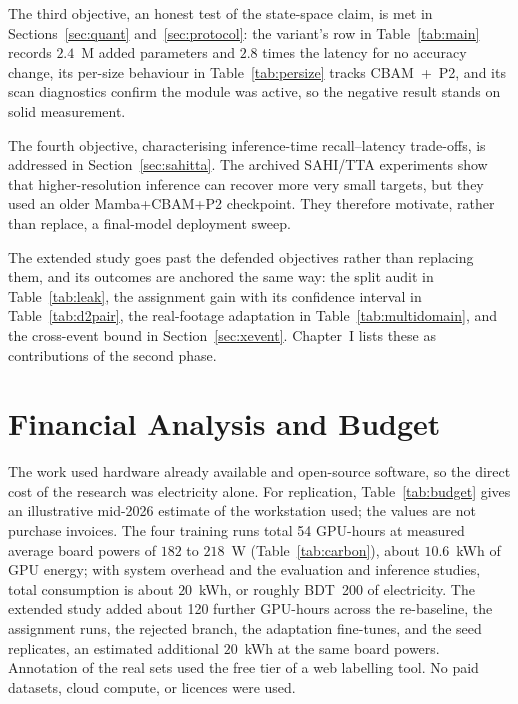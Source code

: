 \documentclass[12pt,a4paper,oneside]{report}
\begin{document}
The third objective, an honest test of the state-space claim, is met in
Sections~\ref{sec:quant} and~\ref{sec:protocol}: the variant's row in
Table~\ref{tab:main} records $2.4$~M added parameters and $2.8$ times the
latency for no accuracy change, its per-size behaviour in
Table~\ref{tab:persize} tracks CBAM~+~P2, and its scan diagnostics confirm
the module was active, so the negative result stands on solid measurement.

The fourth objective, characterising inference-time recall--latency trade-offs,
is addressed in Section~\ref{sec:sahitta}. The archived SAHI/TTA experiments
show that higher-resolution inference can recover more very small targets, but
they used an older Mamba+CBAM+P2 checkpoint. They therefore motivate, rather
than replace, a final-model deployment sweep.

The extended study goes past the defended objectives rather than replacing
them, and its outcomes are anchored the same way: the split audit in
Table~\ref{tab:leak}, the assignment gain with its confidence interval in
Table~\ref{tab:d2pair}, the real-footage adaptation in
Table~\ref{tab:multidomain}, and the cross-event bound in
Section~\ref{sec:xevent}. Chapter~I lists these as contributions of the
second phase.

\section{Financial Analysis and Budget}
\label{sec:budget}
The work used hardware already available and open-source software, so the
direct cost of the research was electricity alone. For replication,
Table~\ref{tab:budget} gives an illustrative mid-2026 estimate of the
workstation used; the values are not purchase invoices. The four training runs total 54
GPU-hours at measured average board powers of $182$ to $218$~W
(Table~\ref{tab:carbon}), about $10.6$~kWh of GPU energy; with system
overhead and the evaluation and inference studies, total consumption is
about $20$~kWh, or roughly BDT~200 of electricity. The extended study added
about 120 further GPU-hours across the re-baseline, the assignment runs, the
rejected branch, the adaptation fine-tunes, and the seed replicates, an
estimated additional $20$~kWh at the same board powers. Annotation of the
real sets used the free tier of a web labelling tool. No paid datasets,
cloud compute, or licences were used.
\end{document}
